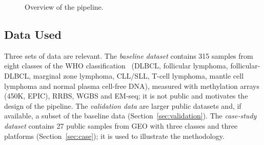 \documentclass[runningheads]{llncs}
\begin{document}
\begin{figure}[!htb]
\centering
{}
\caption{Overview of the pipeline.}
\label{fig:pipeline}
\end{figure}

\subsection{Data Used}
Three sets of data are relevant. The \emph{baseline dataset} contains 315 samples from eight classes of the WHO classification~\cite{alaggio2022} (DLBCL, follicular lymphoma, follicular-DLBCL, marginal zone lymphoma, CLL/SLL, T-cell lymphoma, mantle cell lymphoma and normal plasma cell-free DNA), measured with methylation arrays (450K, EPIC), RRBS, WGBS and EM-seq; it is not public and motivates the design of the pipeline. The \emph{validation data} are larger public datasets and, if available, a subset of the baseline data (Section~\ref{sec:validation}). The \emph{case-study dataset} contains 27 public samples from GEO with three classes and three platforms (Section~\ref{sec:case}); it is used to illustrate the methodology.
\end{document}

